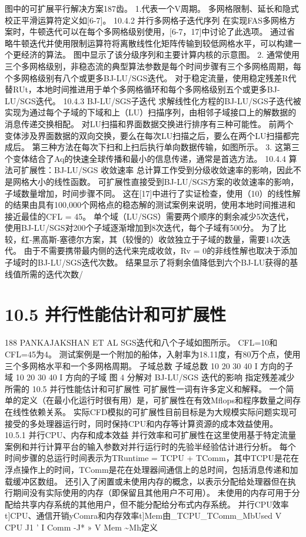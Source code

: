 \documentclass[UTF8,11pt,a4paper,openany,fontset=fandol]{ctexbook}
\begin{document}
图中的可扩展平行解决方案187齿。 1.代表一个V周期。 多网格限制、延长和隐式校正平滑运算符定义如[6-7]。 10.4.2 并行多网格子迭代序列 在实现FAS多网格方案时，牛顿迭代可以在每个多网格级别使用，[6-7，17]中讨论了此选项。 通过省略牛顿迭代并使用限制运算符将离散线性化矩阵传输到较低网格水平，可以构建一个更经济的算法。 图中显示了该分级序列和主要计算内核的示意图。 2. 通常使用三个多网格级别，非稳态流的典型算法参数是每个时间步骤有三个多网格周期，每个多网格级别有八个或更多BJ-LU/SGS迭代。 对于稳定流量，使用稳定残差R代替RUt，本地时间推进用于单个多网格循环和每个多网格级别五个或更多BJ-LU/SGS迭代。 10.4.3 BJ-LU/SGS子迭代 求解线性化方程的BJ-LU/SGS子迭代被实现为通过每个子域的下域和上（LU）扫描序列，由相邻子域接口上的解数据的消息传递交换相配。 对LU扫描和界面数据交换进行排序有三种可能性。 前两个变体涉及界面数据的双向交换，要么在每次LU扫描之后，要么在两个LU扫描都完成后。 第三种方法在每次下扫和上扫后执行单向数据传输，如图所示。 3. 这第三个变体结合了Aq的快速全球传播和最小的信息传递，通常是首选方法。 10.4.4 算法可扩展性：BJ-LU/SGS 收敛速率 总计算工作受到分级收敛速率的影响，因此不是网格大小的线性函数。 可扩展性直接受到BJ-LU/SGS方案的收敛速率的影响，子域数量增加，时间步骤不同。 这在[17]中进行了实证检查，使用（10）的线性解的结果由具有100,000个网格点的稳态解的测试案例来说明，使用本地时间推进和接近最佳的CFL = 45。 单个域（LU/SGS）需要两个顺序的剩余减少5次迭代，使用BJ-LU/SGS对200个子域逐渐增加到8次迭代，每个子域有500分。 为了比较，红-黑高斯-塞德尔方案，其（较慢的）收敛独立于子域的数量，需要14次迭代。 由于不需要携带最内侧的迭代来完成收敛，Rv = 0的非线性解也取决于添加子域时的BJ-LU/SGS迭代次数。 结果显示了将剩余值降低到六个BJ-LU获得的基线值所需的迭代次数/

\section{10.5 并行性能估计和可扩展性}
188 PANKAJAKSHAN ET AL SGS迭代和八个子域如图所示。 CFL=10和CFL=45为4。 测试案例是一个附加的船体，入射率为18.11度，有80万个点，使用三个多网格水平和一个多网格周期。 子域总数 子域总数 10 20 30 40 I 方向的子域 10 20 30 40 I 方向的子域 图 4 分解对 BJ-LU/SGS 迭代的影响 指定残差减少所需的 10.5 并行性能估计和可扩展性 可扩展性一词有许多定义和解释。 一个简单的定义（在最小化运行时很有用）是，可扩展性在有效Mflops和程序数量之间存在线性依赖关系。 实际CFD模拟的可扩展性目前目标是为大规模实际问题实现可接受的多处理器运行时，同时保持CPU和内存等计算资源的成本效益使用。 10.5.1 并行CPU、内存和成本效益 并行效率和可扩展性在这里使用基于特定流量案例和并行计算平台的输入参数对并行运行时的先验半经验估计进行分析。 每个时间步骤的总运行时间表示为TRuntime = TCPU + TComm，其中TCPU是花在浮点操作上的时间，TComm是花在处理器间通信上的总时间，包括消息传递和加载缓冲区数组。 还引入了闲置或未使用内存的概念，以表示分配给处理器但在执行期间没有实际使用的内存（即保留且其他用户不可用）。 未使用的内存可用于分配给共享内存系统的其他用户，但不能分配给分布式内存系统。 并行CPU效率t]CPU、通信开销yComra和内存效率t]Mem由\_TCPU\_TComm\_MbUsed V CPU J1 ' I Comm -J* » V Mem \textasciitilde{}Mh定义
\end{document}
